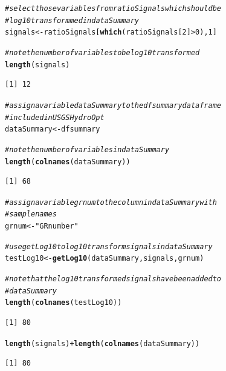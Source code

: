 \documentclass[a4paper,11pt]{article}\usepackage[]{graphicx}\usepackage[]{color}
\makeatletter
\newcommand{\hlnum}[1]{\textcolor[rgb]{0.686,0.059,0.569}{#1}}%
\newcommand{\hlstr}[1]{\textcolor[rgb]{0.192,0.494,0.8}{#1}}%
\newcommand{\hlcom}[1]{\textcolor[rgb]{0.678,0.584,0.686}{\textit{#1}}}%
\newcommand{\hlopt}[1]{\textcolor[rgb]{0,0,0}{#1}}%
\newcommand{\hlstd}[1]{\textcolor[rgb]{0.345,0.345,0.345}{#1}}%
\newcommand{\hlkwb}[1]{\textcolor[rgb]{0.69,0.353,0.396}{#1}}%
\newcommand{\hlkwd}[1]{\textcolor[rgb]{0.737,0.353,0.396}{\textbf{#1}}}%
\newenvironment{kframe}{%
 \def\at@end@of@kframe{}%
 \ifinner\ifhmode%
  \def\at@end@of@kframe{\end{minipage}}%
  \begin{minipage}{\columnwidth}%
 \fi\fi%
 \def\FrameCommand##1{\hskip\@totalleftmargin \hskip-\fboxsep
 \colorbox{shadecolor}{##1}\hskip-\fboxsep
     \hskip-\linewidth \hskip-\@totalleftmargin \hskip\columnwidth}%
 \MakeFramed {\advance\hsize-\width
   \@totalleftmargin\z@ \linewidth\hsize
   \@setminipage}}%
 {\par\unskip\endMakeFramed%
 \at@end@of@kframe}
\newenvironment{knitrout}{}{} %
\makeatother
\begin{document}
\begin{knitrout}
\color{fgcolor}\begin{kframe}
\begin{alltt}
\hlcom{# select those variables from ratioSignals which should be}
\hlcom{# log 10 transformmed in dataSummary}
\hlstd{signals} \hlkwb{<-} \hlstd{ratioSignals[}\hlkwd{which}\hlstd{(ratioSignals[}\hlnum{2}\hlstd{]} \hlopt{>} \hlnum{0}\hlstd{),} \hlnum{1}\hlstd{]}

\hlcom{# note the number of variables to be log 10 transformed}
\hlkwd{length}\hlstd{(signals)}
\end{alltt}
\begin{verbatim}
[1] 12
\end{verbatim}
\begin{alltt}
\hlcom{# assign a variable dataSummary to the dfsummary dataframe}
\hlcom{# included in USGSHydroOpt}
\hlstd{dataSummary} \hlkwb{<-} \hlstd{dfsummary}

\hlcom{# note the number of variables in dataSummary}
\hlkwd{length}\hlstd{(}\hlkwd{colnames}\hlstd{(dataSummary))}
\end{alltt}
\begin{verbatim}
[1] 68
\end{verbatim}
\begin{alltt}
\hlcom{# assign a variable grnum to the column in dataSummary with}
\hlcom{# sample names}
\hlstd{grnum} \hlkwb{<-} \hlstr{"GRnumber"}

\hlcom{# use getLog10 to log 10 transform signals in dataSummary}
\hlstd{testLog10} \hlkwb{<-} \hlkwd{getLog10}\hlstd{(dataSummary, signals, grnum)}

\hlcom{# note that the log 10 transformed signals have been added to}
\hlcom{# dataSummary}
\hlkwd{length}\hlstd{(}\hlkwd{colnames}\hlstd{(testLog10))}
\end{alltt}
\begin{verbatim}
[1] 80
\end{verbatim}
\begin{alltt}
\hlkwd{length}\hlstd{(signals)} \hlopt{+} \hlkwd{length}\hlstd{(}\hlkwd{colnames}\hlstd{(dataSummary))}
\end{alltt}
\begin{verbatim}
[1] 80
\end{verbatim}
\end{kframe}
\end{knitrout}

\end{document}
